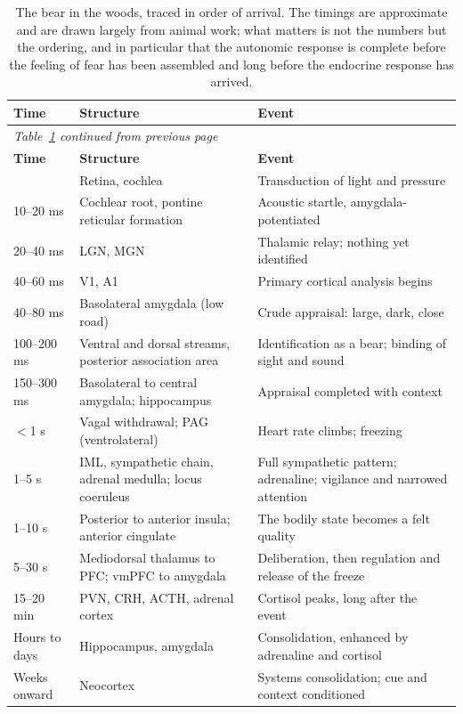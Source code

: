 \documentclass[11pt]{article}
\begin{document}
{\footnotesize
\renewcommand{\arraystretch}{1.3}
\begin{longtable}{p{2.4cm} p{4.6cm} p{7.2cm}}
\caption{The bear in the woods, traced in order of arrival. The timings are approximate and are drawn largely from animal work; what matters is not the numbers but the ordering, and in particular that the autonomic response is complete before the feeling of fear has been assembled and long before the endocrine response has arrived.}
\label{tab:bear} \\
\toprule
\textbf{Time} & \textbf{Structure} & \textbf{Event} \\
\midrule
\endfirsthead
\multicolumn{3}{l}{\emph{\small Table~\ref{tab:bear} continued from previous page}} \\
\toprule
\textbf{Time} & \textbf{Structure} & \textbf{Event} \\
\midrule
\endhead
\bottomrule
\endfoot
\bottomrule
\endlastfoot
0 & Retina, cochlea & Transduction of light and pressure \\
10--20 ms & Cochlear root, pontine reticular formation & Acoustic startle, amygdala-potentiated \\
20--40 ms & LGN, MGN & Thalamic relay; nothing yet identified \\
40--60 ms & V1, A1 & Primary cortical analysis begins \\
40--80 ms & Basolateral amygdala (low road) & Crude appraisal: large, dark, close \\
100--200 ms & Ventral and dorsal streams, posterior association area & Identification as a bear; binding of sight and sound \\
150--300 ms & Basolateral to central amygdala; hippocampus & Appraisal completed with context \\
$<$1 s & Vagal withdrawal; PAG (ventrolateral) & Heart rate climbs; freezing \\
1--5 s & IML, sympathetic chain, adrenal medulla; locus coeruleus & Full sympathetic pattern; adrenaline; vigilance and narrowed attention \\
1--10 s & Posterior to anterior insula; anterior cingulate & The bodily state becomes a felt quality \\
5--30 s & Mediodorsal thalamus to PFC; vmPFC to amygdala & Deliberation, then regulation and release of the freeze \\
15--20 min & PVN, CRH, ACTH, adrenal cortex & Cortisol peaks, long after the event \\
Hours to days & Hippocampus, amygdala & Consolidation, enhanced by adrenaline and cortisol \\
Weeks onward & Neocortex & Systems consolidation; cue and context conditioned \\
\end{longtable}
}
\end{document}
